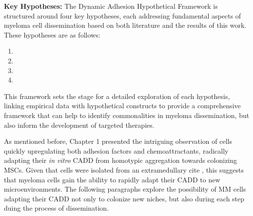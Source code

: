 \textbf{Key Hypotheses:}
The Dynamic Adhesion Hypothetical Framework is structured around four key
hypotheses, each addressing fundamental aspects of myeloma cell dissemination
based on both literature and the results of this work. These hypotheses are as
follows:

\begin{enumerate}[parsep=4pt]
      \item \caddadaptation
      \item \caddadaptibility
      \item \cadddiversity
      \item \caddtrigger
\end{enumerate}


This framework sets the stage for a detailed exploration of each hypothesis,
linking empirical data with hypothetical constructs to provide a comprehensive
framework that can help to identify commonalities in myeloma dissemination, but
also inform the development of targeted therapies.




\unnsubsection{\caddadaptationtitle}%
\label{sec:discussion_caddadaptation}%
As mentioned before, Chapter 1 presented the intriguing observation of \MAina
cells quickly upregulating both adhesion factors and chemoattractants, radically
adapting their \textit{in vitro} \ac{CADD} from homotypic aggregation towards
colonizing \acp{MSC}. Given that \INA cells were isolated from an extramedullary
cite , this suggests that myeloma cells gain the ability to
rapidly adapt their \ac{CADD} to new microenvironments. The following paragraphs
explore the possibility of MM cells adapting their \ac{CADD} not only to
colonize new niches, but also during each step duing the process of
dissemination.





